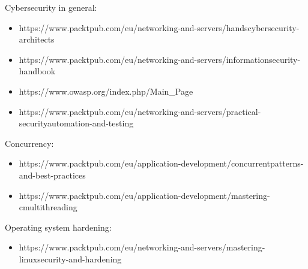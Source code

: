 
Cybersecurity in general:

\begin{itemize}
\item 
https://www.packtpub.com/eu/networking-and-servers/handscybersecurity-architects

\item 
https://www.packtpub.com/eu/networking-and-servers/informationsecurity-handbook

\item 
https://www.owasp.org/index.php/Main\_Page

\item 
https://www.packtpub.com/eu/networking-and-servers/practical-securityautomation-and-testing
\end{itemize}


Concurrency:

\begin{itemize}
\item 
https://www.packtpub.com/eu/application-development/concurrentpatterns-and-best-practices

\item 
https://www.packtpub.com/eu/application-development/mastering-cmultithreading
\end{itemize}

Operating system hardening:

\begin{itemize}
\item 
https://www.packtpub.com/eu/networking-and-servers/mastering-linuxsecurity-and-hardening
\end{itemize}